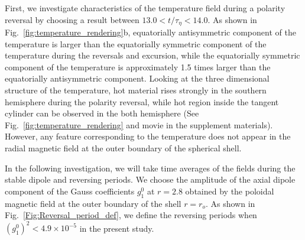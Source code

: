 First, we investigate characteristics of the temperature field during a polarity reversal by choosing a result between $13.0 < t/\tau_{\eta} < 14.0$. 
As shown in 
{\color{red}
Fig.~\ref{fig:temperature_rendering}b,
}
equatorially antisymmetric component of the temperature is larger than the equatorially symmetric component of the temperature during the reversals and excursion, while the equatorially symmetric component of the temperature is approximately 1.5 times larger than the equatorially antisymmetric component. 
Looking at the three dimensional structure of the temperature, hot material rises strongly in the southern hemisphere during the polarity reversal, while hot region inside the tangent cylinder can be observed in the both hemisphere (See Fig.~\ref{fig:temperature_rendering} and movie in the supplement materials). 
{\color{red}
However, any feature corresponding to the temperature does not appear in the radial magnetic field at the outer boundary of the spherical shell.
}

In the following investigation, we will take time averages of the fields during the stable dipole and reversing periods. 
We choose the amplitude of the axial dipole component of the Gauss coefficients $g_{1}^{0}$ at $r = 2.8$ obtained by the poloidal magnetic field at the outer boundary of the shell $r = r_{o}$. 
As shown in Fig.~\ref{Fig:Reversal_period_def}, we define the reversing periods when $\left( g_{1}^{0} \right)^2 < 4.9 \times 10^{-5}$ in the present study. 


